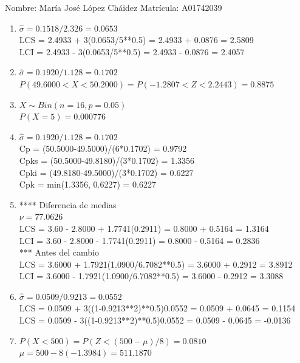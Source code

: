 \documentclass[8pt]{report}
\begin{document}
 \newpage

Nombre: \underline{\hspace*{.2in}}
María José López Cháidez
\underline{\hspace*{.2in}} \quad Matr\'icula:\underline{\hspace*{.2in}}
A01742039
\underline{\hspace*{.2in}} \\

\begin{enumerate}
\item $\hat\sigma = 0.1518/2.326 = 0.0653$\\
LCS = 2.4933 + 3(0.0653/5**0.5) = 2.4933 + 0.0876 = 2.5809\\
LCI = 2.4933 - 3(0.0653/5**0.5) = 2.4933 - 0.0876 = 2.4057
\item $\hat\sigma = 0.1920/1.128 = 0.1702$\\
$P(49.6000 < X < 50.2000) = P(-1.2807 < Z < 2.2443) = 0.8875$\\
\item $X \sim Bin(n=16, p=0.05)$\\
$P(X = 5) = 0.000776$
\item $\hat\sigma = 0.1920/1.128 = 0.1702$\\
Cp = (50.5000-49.5000)/(6*0.1702) = 0.9792\\
Cpks = (50.5000-49.8180)/(3*0.1702) = 1.3356\\
Cpki = (49.8180-49.5000)/(3*0.1702) = 0.6227\\
Cpk = min(1.3356, 0.6227) = 0.6227
\item **** Diferencia de medias\\
$\nu = 77.0626$\\
LCS = 3.60 - 2.8000 + 1.7741(0.2911) = 0.8000 + 0.5164 = 1.3164\\
LCI = 3.60 - 2.8000 - 1.7741(0.2911) = 0.8000 - 0.5164 = 0.2836\\
*** Antes del cambio\\
LCS = 3.6000 + 1.7921(1.0900/6.7082**0.5) = 3.6000 + 0.2912 = 3.8912\\
LCI = 3.6000 - 1.7921(1.0900/6.7082**0.5) = 3.6000 - 0.2912 = 3.3088\\
\item $\hat\sigma = 0.0509/0.9213 = 0.0552$\\
LCS = 0.0509 + 3((1-0.9213**2)**0.5)0.0552 = 0.0509 + 0.0645 = 0.1154\\
LCS = 0.0509 - 3((1-0.9213**2)**0.5)0.0552 = 0.0509 - 0.0645 = -0.0136
\item $P(X < 500) = P(Z < (500-\mu)/8) = 0.0810$\\
$\mu = 500 - 8(-1.3984) = 511.1870$\\
\end{enumerate}
\end{document}
